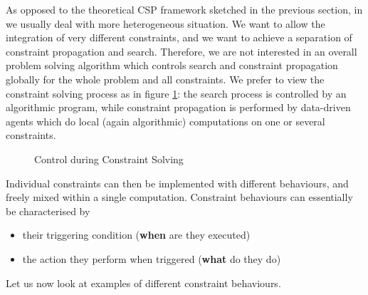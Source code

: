 As opposed to the theoretical CSP framework sketched in the previous section,
in \eclipse{} we usually deal with more heterogeneous situation.
We want to allow the integration of very different constraints,
and we want to achieve a separation of constraint propagation and search.
Therefore, we are not interested in an overall problem solving algorithm
which controls search and constraint propagation globally for the whole
problem and all constraints.
We prefer to view the constraint solving process as in figure \ref{figclpexec}:
the search process is controlled by an algorithmic program,
while constraint propagation is performed by data-driven agents which
do local (again algorithmic) computations on one or several constraints.
\begin{figure}
\begin{center}
\end{center}
\caption{Control during Constraint Solving}
\label{figclpexec}
\end{figure}
Individual constraints can then be implemented with different behaviours,
and freely mixed within a single computation.
Constraint behaviours can essentially be characterised by
\begin{itemize}
\item their triggering condition ({\bf when} are they executed)
\item the action they perform when triggered ({\bf what} do they do)
\end{itemize}
Let us now look at examples of different constraint behaviours.

